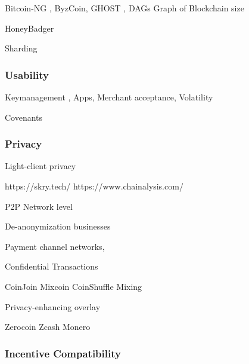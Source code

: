 Bitcoin-NG \parencite{194906}, ByzCoin, GHOST \parencite{kiayias2016trees,Lewenberg2015,Sompolinsky2015}, DAGs
Graph of Blockchain size

HoneyBadger \parencite{millerhoney}

Sharding

\subsubsection{Usability}

Keymanagement \parencite{eskandari2015first}, Apps, Merchant acceptance, Volatility \parencite{Luther2014,Sapuric2014}

\parencite{Decker2014}

Covenants \parencite{moserbitcoin}



\subsubsection{Privacy}

\parencite{Ron2013}
\parencite{Androulaki2013}
\parencite{Reid2013}
\parencite{Babaioff:2012:BRB:2229012.2229022}
\parencite{fi5020237}
\parencite{Moser2014}


\parencite{Spagnuolo2014}

Light-client privacy \parencite{Gervais:2014:PPB:2664243.2664267}



https://skry.tech/
https://www.chainalysis.com/

P2P Network level
\parencite{Koshy2014}
\parencite{Biryukov:2014:DCB:2660267.2660379}


De-anonymization
businesses

Payment channel networks,

 Confidential Transactions \parencite{Androulaki2014}

CoinJoin \parencite{maxwellcoinjoin}
Mixcoin \parencite{Bonneau2014}
CoinShuffle \parencite{Ruffing2014}
Mixing \parencite{Bissias:2014:SMB:2665943.2665955,Valenta2015}

Privacy-enhancing overlay \parencite{Meiklejohn2015}

Zerocoin \parencite{6547123}
Zcash \parencite{6956581}
Monero

\subsubsection{Incentive Compatibility}

